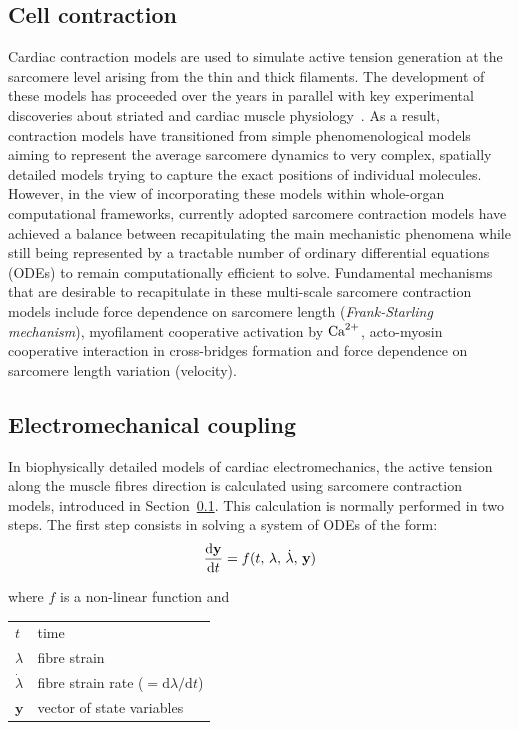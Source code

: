 %
%
%
\subsection{Cell contraction}\label{sec:cell_contr_modelling}
Cardiac contraction models are used to simulate active tension generation at the sarcomere level arising from the thin and thick filaments. The development of these models has proceeded over the years in parallel with key experimental discoveries about striated and cardiac muscle physiology~\cite{Niederer:2019}. As a result, contraction models have transitioned from simple phenomenological models aiming to represent the average sarcomere dynamics to very complex, spatially detailed models trying to capture the exact positions of individual molecules. However, in the view of incorporating these models within whole-organ computational frameworks, currently adopted sarcomere contraction models have achieved a balance between recapitulating the main mechanistic phenomena while still being represented by a tractable number of ordinary differential equations (\acs{ODE}s) to remain computationally efficient to solve. Fundamental mechanisms that are desirable to recapitulate in these multi-scale sarcomere contraction models include force dependence on sarcomere length (\textit{Frank-Starling mechanism}), myofilament cooperative activation by $\textrm{Ca}^{2+}$, acto-myosin cooperative interaction in cross-bridges formation and force dependence on sarcomere length variation (velocity).


%
%
%
\subsection{Electromechanical coupling}\label{sec:mathelecmechcoupl}
In biophysically detailed models of cardiac electromechanics, the active tension along the muscle fibres direction is calculated using sarcomere contraction models, introduced in Section~\ref{sec:cell_contr_modelling}. This calculation is normally performed in two steps. The first step consists in solving a system of ODEs of the form:
%
\begin{equation}\label{eq:epmechcoupling}
    \dfrac{\mathrm{d}{\mathbf{y}}}{\mathrm{d}{t}} = f(t,\,\lambda,\,\dot{\lambda},\,\mathbf{y}) 
\end{equation}

\noindent
where $f$ is a non-linear function and

\vspace{0.2cm}
\begin{tabular}{ll}
    $t$             & time \\
    $\lambda$       & fibre strain \\
    $\dot{\lambda}$ & fibre strain rate ($=\mathrm{d}\lambda / \mathrm{d}t$) \\
    $\mathbf{y}$    & vector of state variables
\end{tabular}

